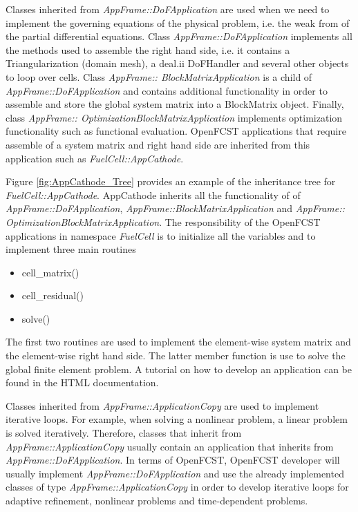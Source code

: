 Classes inherited from \textit{AppFrame::DoFApplication} are used when we need to implement the governing equations of the physical problem, i.e. the weak from of the partial differential equations. Class \textit{AppFrame::DoFApplication} implements all the methods used to assemble the right hand side, i.e. it contains a Triangularization (domain mesh), a deal.ii DoFHandler and several other objects to loop over cells. Class \textit{AppFrame:: BlockMatrixApplication} is a child of \textit{AppFrame::DoFApplication} and contains additional functionality in order to assemble and store the global system matrix into a BlockMatrix object. Finally, class \textit{AppFrame:: OptimizationBlockMatrixApplication} implements optimization functionality such as functional evaluation. OpenFCST applications that require assemble of a system matrix and right hand side are inherited from this application such as \textit{FuelCell::AppCathode}. 

Figure \ref{fig:AppCathode_Tree} provides an example of the inheritance tree for \textit{FuelCell::AppCathode}. AppCathode inherits all the functionality of of \textit{AppFrame::DoFApplication}, \textit{AppFrame::BlockMatrixApplication} and \textit{AppFrame:: OptimizationBlockMatrixApplication}. The responsibility of the OpenFCST applications in namespace \textit{FuelCell} is to initialize all the variables and to implement three main routines
\begin{itemize}
 \item cell\_matrix()
 \item cell\_residual()
 \item solve()
\end{itemize}
The first two routines are used to implement the element-wise system matrix and the element-wise right hand side. The latter member function is use to solve the global finite element problem. A tutorial on how to develop an application can be found in the HTML documentation.

Classes inherited from \textit{AppFrame::ApplicationCopy} are used to implement iterative loops. For example, when solving a nonlinear problem, a linear problem is solved iteratively. Therefore, classes that inherit from \textit{AppFrame::ApplicationCopy} usually contain an application that inherits from \textit{AppFrame::DoFApplication}. In terms of OpenFCST, OpenFCST developer will usually implement \textit{AppFrame::DoFApplication} and use the already implemented classes of type \textit{AppFrame::ApplicationCopy} in order to develop iterative loops for adaptive refinement, nonlinear problems and time-dependent problems.

